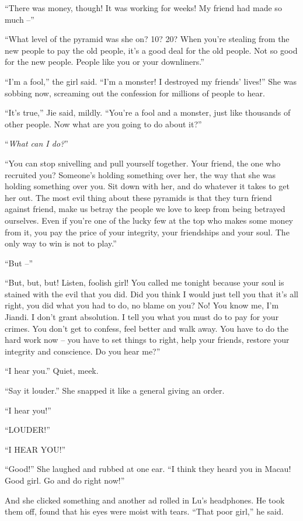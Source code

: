 ``There was money, though! It was working for weeks! My friend had
made so much --''

``What level of the pyramid was she on? 10? 20? When you're stealing
from the new people to pay the old people, it's a good deal for the
old people. Not so good for the new people. People like you or your
downliners.''

``I'm a fool,'' the girl said. ``I'm a monster! I destroyed my
friends' lives!'' She was sobbing now, screaming out the confession
for millions of people to hear.

``It's true,'' Jie said, mildly. ``You're a fool and a monster, just
like thousands of other people. Now what are you going to do about
it?''

``\emph{What can I do?}''

``You can stop snivelling and pull yourself together. Your friend,
the one who recruited you? Someone's holding something over her,
the way that she was holding something over you. Sit down with her,
and do whatever it takes to get her out. The most evil thing about
these pyramids is that they turn friend against friend, make us
betray the people we love to keep from being betrayed ourselves.
Even if you're one of the lucky few at the top who makes some money
from it, you pay the price of your integrity, your friendships and
your soul. The only way to win is not to play.''

``But --''

``But, but, but! Listen, foolish girl! You called me tonight because
your soul is stained with the evil that you did. Did you think I
would just tell you that it's all right, you did what you had to
do, no blame on you? No! You know me, I'm Jiandi. I don't grant
absolution. I tell you what you must do to pay for your crimes. You
don't get to confess, feel better and walk away. You have to do the
hard work now -- you have to set things to right, help your
friends, restore your integrity and conscience. Do you hear me?''

``I hear you.'' Quiet, meek.

``Say it louder.'' She snapped it like a general giving an order.

``I hear you!''

``LOUDER!''

``I HEAR YOU!''

``Good!'' She laughed and rubbed at one ear. ``I think they heard you
in Macau! Good girl. Go and do right now!''

And she clicked something and another ad rolled in Lu's headphones.
He took them off, found that his eyes were moist with tears. ``That
poor girl,'' he said.

